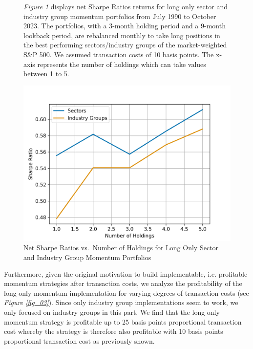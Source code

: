 \documentclass[a4paper,12pt,twoside]{article}
\begin{document}
\begin{figure}[H] 
       \captionsetup{justification=centering}
    \caption{Net Sharpe Ratios vs.~Number of Holdings for Long Only Sector and Industry Group Momentum Portfolios} 
    \label{fig_04}
        \textit{Figure \ref{fig_04}} displays net Sharpe Ratios returns for long only sector and industry group momentum portfolios from July 1990 to October 2023. The portfolios, with a 3-month holding period and a 9-month lookback period, are rebalanced monthly to take long positions in the best performing sectors/industry groups of the market-weighted S\&P 500. We assumed transaction costs of 10 basis points. The x-axis represents the number of holdings which can take values between 1 to 5.
    \centerline{\includegraphics[width=1\textwidth]{Plots/robustness_check_holdings.png}}
\end{figure}


\newpage
Furthermore, given the original motivation to build implementable, i.e. profitable momentum strategies after transaction costs, we analyze the profitability of the long only momentum implementation for varying degrees of transaction costs (see \textit{Figure \ref{fig_03}}). Since only industry group implementations seem to work, we only focused on industry groups in this part. We find that the long only momentum strategy is profitable up to 25 basis points proportional transaction cost whereby the strategy is therefore also profitable with 10 basis points proportional transaction cost as previously shown.\\
\end{document}
